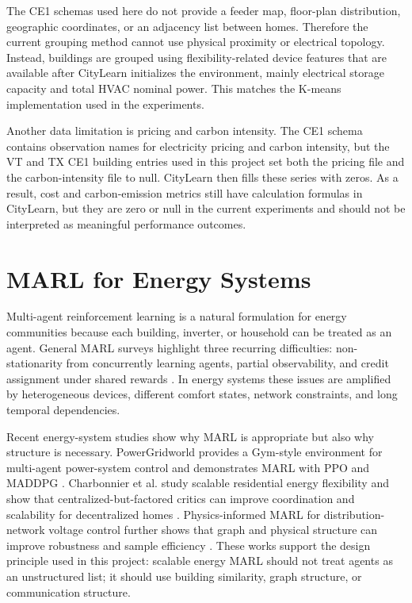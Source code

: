 The CE1 schemas used here do not provide a feeder map, floor-plan distribution,
geographic coordinates, or an adjacency list between homes. Therefore the
current grouping method cannot use physical proximity or electrical topology.
Instead, buildings are grouped using flexibility-related device features that
are available after CityLearn initializes the environment, mainly electrical
storage capacity and total HVAC nominal power. This matches the K-means
implementation used in the experiments.

Another data limitation is pricing and carbon intensity. The CE1 schema contains
observation names for electricity pricing and carbon intensity, but the VT and TX
CE1 building entries used in this project set both the pricing file and the
carbon-intensity file to null. CityLearn then fills these series with zeros.
As a result, cost and carbon-emission metrics still have calculation formulas in
CityLearn, but they are zero or null in the current experiments and should not be
interpreted as meaningful performance outcomes.

\section{MARL for Energy Systems}

Multi-agent reinforcement learning is a natural formulation for energy
communities because each building, inverter, or household can be treated as an
agent. General MARL surveys highlight three recurring difficulties:
non-stationarity from concurrently learning agents, partial observability, and
credit assignment under shared rewards \cite{marlOverview2019}. In energy
systems these issues are amplified by heterogeneous devices, different comfort
states, network constraints, and long temporal dependencies.

Recent energy-system studies show why MARL is appropriate but also why
structure is necessary. PowerGridworld provides a Gym-style environment for
multi-agent power-system control and demonstrates MARL with PPO and MADDPG
\cite{powergridworld2022}. Charbonnier et al. study scalable residential
energy flexibility and show that centralized-but-factored critics can improve
coordination and scalability for decentralized homes \cite{charbonnier2025}.
Physics-informed MARL for distribution-network voltage control further shows
that graph and physical structure can improve robustness and sample efficiency
\cite{physicsMADRL2024}. These works support the design principle used in this
project: scalable energy MARL should not treat agents as an unstructured list;
it should use building similarity, graph structure, or communication structure.

